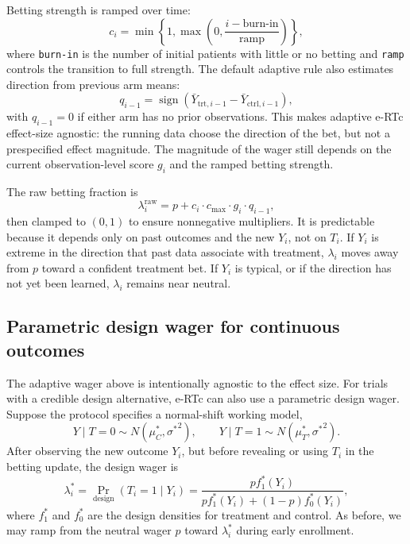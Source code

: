 \documentclass[10pt]{article}
\begin{document}
Betting strength is ramped over time:
\begin{equation}
c_i = \min\left\{1, \max\left(0, \frac{i - \text{burn-in}}{\text{ramp}}\right)\right\},
\end{equation}
where \texttt{burn-in} is the number of initial patients with little or no betting and \texttt{ramp} controls the transition to full strength. The default adaptive rule also estimates direction from previous arm means:
\begin{equation}
q_{i-1} = \operatorname{sign}\left(\bar{Y}_{\text{trt},i-1} - \bar{Y}_{\text{ctrl},i-1}\right),
\end{equation}
with $q_{i-1}=0$ if either arm has no prior observations. This makes adaptive e-RTc effect-size agnostic: the running data choose the direction of the bet, but not a prespecified effect magnitude. The magnitude of the wager still depends on the current observation-level score $g_i$ and the ramped betting strength.

The raw betting fraction is
\begin{equation}
\lambda_i^{\mathrm{raw}} = p + c_i \cdot c_{\max} \cdot g_i \cdot q_{i-1},
\end{equation}
then clamped to $(0,1)$ to ensure nonnegative multipliers. It is predictable because it depends only on past outcomes and the new $Y_i$, not on $T_i$. If $Y_i$ is extreme in the direction that past data associate with treatment, $\lambda_i$ moves away from $p$ toward a confident treatment bet. If $Y_i$ is typical, or if the direction has not yet been learned, $\lambda_i$ remains near neutral.

\subsection{Parametric design wager for continuous outcomes}

The adaptive wager above is intentionally agnostic to the effect size. For trials with a credible design alternative, e-RTc can also use a parametric design wager. Suppose the protocol specifies a normal-shift working model,
\[
Y \mid T=0 \sim N(\mu_C^\ast, {\sigma^\ast}^2),
\qquad
Y \mid T=1 \sim N(\mu_T^\ast, {\sigma^\ast}^2).
\]
After observing the new outcome $Y_i$, but before revealing or using $T_i$ in the betting update, the design wager is
\[
\lambda_i^\ast
= \Pr_{\text{design}}(T_i=1 \mid Y_i)
=
\frac{p f_1^\ast(Y_i)}
{p f_1^\ast(Y_i) + (1-p) f_0^\ast(Y_i)},
\]
where $f_1^\ast$ and $f_0^\ast$ are the design densities for treatment and control. As before, we may ramp from the neutral wager $p$ toward $\lambda_i^\ast$ during early enrollment.
\end{document}
